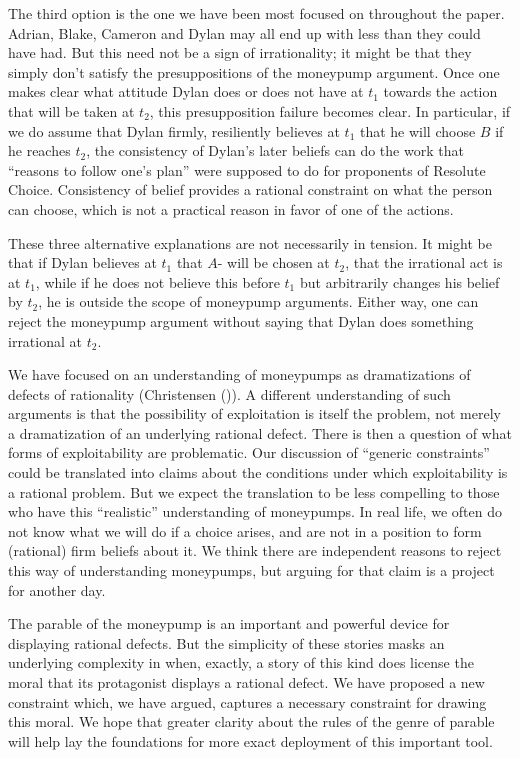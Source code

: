 \documentclass[
  11pt,
  letterpaper,
  DIV=11,
  numbers=noendperiod,
  twoside]{scrartcl}
\begin{document}
The third option is the one we have been most focused on throughout the
paper. Adrian, Blake, Cameron and Dylan may all end up with less than
they could have had. But this need not be a sign of irrationality; it
might be that they simply don't satisfy the presuppositions of the
moneypump argument. Once one makes clear what attitude Dylan does or
does not have at \(t_1\) towards the action that will be taken at
\(t_2\), this presupposition failure becomes clear. In particular, if we
do assume that Dylan firmly, resiliently believes at \(t_1\) that he
will choose \(B\) if he reaches \(t_2\), the consistency of Dylan's
later beliefs can do the work that ``reasons to follow one's plan'' were
supposed to do for proponents of Resolute Choice. Consistency of belief
provides a rational constraint on what the person can choose, which is
not a practical reason in favor of one of the actions.

These three alternative explanations are not necessarily in tension. It
might be that if Dylan believes at \(t_1\) that \(A\)- will be chosen at
\(t_2\), that the irrational act is at \(t_1\), while if he does not
believe this before \(t_1\) but arbitrarily changes his belief by
\(t_2\), he is outside the scope of moneypump arguments. Either way, one
can reject the moneypump argument without saying that Dylan does
something irrational at \(t_2\).

We have focused on an understanding of moneypumps as dramatizations of
defects of rationality (Christensen
()). A different understanding
of such arguments is that the possibility of exploitation is itself the
problem, not merely a dramatization of an underlying rational defect.
There is then a question of what forms of exploitability are
problematic. Our discussion of ``generic constraints'' could be
translated into claims about the conditions under which exploitability
is a rational problem. But we expect the translation to be less
compelling to those who have this ``realistic'' understanding of
moneypumps. In real life, we often do not know what we will do if a
choice arises, and are not in a position to form (rational) firm beliefs
about it. We think there are independent reasons to reject this way of
understanding moneypumps, but arguing for that claim is a project for
another day.

The parable of the moneypump is an important and powerful device for
displaying rational defects. But the simplicity of these stories masks
an underlying complexity in when, exactly, a story of this kind does
license the moral that its protagonist displays a rational defect. We
have proposed a new constraint which, we have argued, captures a
necessary constraint for drawing this moral. We hope that greater
clarity about the rules of the genre of parable will help lay the
foundations for more exact deployment of this important tool.
\end{document}
